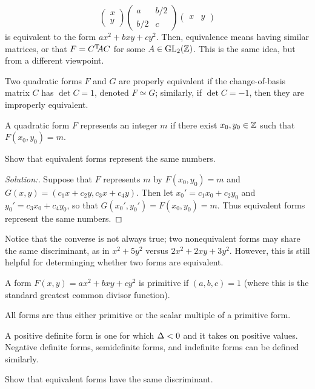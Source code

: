 \[\begin{pmatrix}x\\y\end{pmatrix}
\begin{pmatrix}a&b/2\\b/2&c\end{pmatrix}
\begin{pmatrix}x&y\end{pmatrix}\]
is equivalent to the form $ax^2+bxy+cy^2$. Then, equivalence means having similar matrices, or that $F = C^{\mathrm{T}}{}\!\!AC$ for some $A\in\operatorname{GL}_{2}(\mathbb{Z})$. This is the same idea, but from a different viewpoint.
\begin{defn}Two quadratic forms $F$ and $G$ are properly equivalent if the change-of-basis matrix $C$ has $\det C = 1$, denoted $F \simeq G$; similarly, if $\det C = -1$, then they are improperly equivalent.\end{defn}
\begin{defn} A quadratic form $F$ represents an integer $m$ if there exist $x_0,y_0\in\mathbb{Z}$ such that $F(x_0,y_0) = m$.\end{defn}
\begin{ex} Show that equivalent forms represent the same numbers.\end{ex}
\begin{proof}[Solution:] Suppose that $F$ represents $m$ by $F(x_0,y_0) = m$ and $G(x,y) = (c_1x+c_2y,c_3x+c_4y)$. Then let $x_0' = c_1x_0+c_2y_0$ and $y_0'=c_3x_0+c_4y_0$, so that $G(x_0',y_0') = F(x_0,y_0)=m$. Thus equivalent forms represent the same numbers.\end{proof}
Notice that the converse is not always true; two nonequivalent forms may share the same discriminant, as in $x^2+5y^2$ versus $2x^2+2xy+3y^2$. However, this is still helpful for determinging whether two forms are equivalent.
\begin{defn} A form $F(x,y) = ax^2+bxy+cy^2$ is primitive if $(a,b,c) = 1$ (where this is the standard greatest common divisor function).\end{defn}
All forms are thus either primitive or the scalar multiple of a primitive form.
\begin{defn} A positive definite form is one for which $\Delta < 0$ and it takes on positive values. Negative definite forms, semidefinite forms, and indefinite forms can be defined similarly.\end{defn}
\begin{ex} Show that equivalent forms have the same discriminant.\end{ex}

